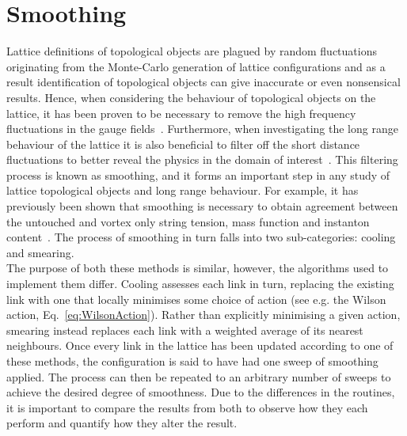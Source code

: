 
\chapter{Smoothing}\label{chapter:Smoothing}
\ifpdf
    \graphicspath{{Chapter5/Figs/Raster/}{Chapter5/Figs/PDF/}{Chapter5/Figs/}}
\else
    \graphicspath{{Chapter5/Figs/Vector/}{Chapter5/Figs/}}
\fi

Lattice definitions of topological objects are plagued by random fluctuations originating from the Monte-Carlo generation of lattice configurations and as a result identification of topological objects can give inaccurate or even nonsensical results. Hence, when considering the behaviour of topological objects on the lattice, it has been proven to be necessary to remove the high frequency fluctuations in the gauge fields~\cite{Bonnet:2000dc}. Furthermore, when investigating the long range behaviour of the lattice it is also beneficial to filter off the short distance fluctuations to better reveal the physics in the domain of interest~\cite{Moran:2008ra}. This filtering process is known as smoothing, and it forms an important step in any study of lattice topological objects and long range behaviour. For example, it has previously been shown that smoothing is necessary to obtain agreement between the untouched and vortex only string tension, mass function and instanton content~\cite{Trewartha:2015ida,Trewartha:2015nna,Trewartha:2017ive}. The process of smoothing in turn falls into two sub-categories: cooling and smearing.\\

The purpose of both these methods is similar, however, the algorithms used to implement them differ. Cooling assesses each link in turn, replacing the existing link with one that locally minimises some choice of action (see e.g. the Wilson action, Eq.~\ref{eq:WilsonAction}). Rather than explicitly minimising a given action, smearing  instead replaces each link with a weighted average of its nearest neighbours. Once every link in the lattice has been updated according to one of these methods, the configuration is said to have had one sweep of smoothing applied. The process can then be repeated to an arbitrary number of sweeps to achieve the desired degree of smoothness.  Due to the differences in the routines, it is important to compare the results from both to observe how they each perform and quantify how they alter the result.

